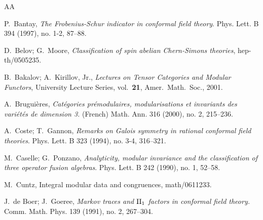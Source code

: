 \documentclass[12pt,psamsfonts]{amsart}
\numberwithin{equation}{section}
\theoremstyle{definition}
\begin{document}
\begin{thebibliography}{AA}



P.\ Bantay, \emph{The Frobenius-Schur indicator in conformal field theory}. Phys.
Lett. B 394 (1997), no. 1-2, 87--88.





D.\ Belov; G.\ Moore, \emph{Classification of spin abelian Chern-Simons theories},
hep-th/0505235.

 B.\ Bakalov; A.\ Kirillov, Jr., {\em Lectures on
Tensor Categories and Modular Functors}, University Lecture
Series, vol.\ {\bf 21},  Amer.\ Math.\ Soc., 2001.

 A.\ Brugui\`eres, \textit{Cat\'egories pr\'emodulaires, modularisations et invariants des vari\'et\'es de dimension 3.}
(French)  Math. Ann.  316  (2000),  no. 2, 215--236.

A.\ Coste; T.\ Gannon, \emph{Remarks on Galois symmetry in rational conformal field theories}.
Phys. Lett. B 323 (1994), no. 3-4, 316--321.

M.\ Caselle; G.\ Ponzano, \emph{Analyticity, modular invariance and the classification of three operator fusion algebras}.
Phys. Lett. B 242 (1990), no. 1, 52--58.

M.\ Cuntz, Integral modular data and congruences, math/0611233.


 J.\ de Boer; J.\ Goeree, \textit{Markov traces and ${\rm II}\sb 1$ factors in conformal field theory. } Comm. Math. Phys.  139  (1991),  no. 2, 267--304.



\end{thebibliography}
\end{document}

